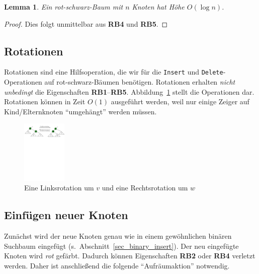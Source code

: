 \documentclass[10pt,reqno]{amsart}
\numberwithin{equation}{section}
\newtheorem{lemma}[definition]{Lemma}
\begin{document}
\begin{lemma}\label{lem_rb}
	Ein rot-schwarz-Baum mit $n$ Knoten hat H\"ohe $O(\log n)$.
\end{lemma}
\begin{proof}
	Dies folgt unmittelbar aus {\bf RB4} und {\bf RB5}.
\end{proof}

\subsection{Rotationen}\label{sec_rb_rot}
Rotationen sind eine Hilfsoperation, die wir f\"ur die {\tt Insert} und {\tt Delete}-Operationen auf rot-schwarz-B\"aumen ben\"otigen.
Rotationen erhalten {\em nicht unbedingt} die Eigenschaften {\bf RB1}--{\bf RB5}.
Abbildung~\ref{fig_rotate} stellt die Operationen dar.
Rotationen k\"onnen in Zeit $O(1)$ ausgef\"uhrt werden, weil nur einige Zeiger auf Kind/Elternknoten ``umgeh\"angt'' werden m\"ussen.

\begin{figure}
	\includegraphics[height=30mm]{./images/rotate1.pdf}
	\caption{Eine Linksrotation um $v$ und eine Rechtsrotation um $w$}\label{fig_rotate}
\end{figure}

\subsection{Einf\"ugen neuer Knoten}\label{sec_rb_insert}

Zun\"achst wird der neue Knoten genau wie in einem gew\"ohnlichen bin\"aren Suchbaum eingef\"ugt (s.\ Abschnitt~\ref{sec_binary_insert}).
Der neu eingef\"ugte Knoten wird {\em rot} gef\"arbt.
Dadurch k\"onnen Eigenschaften {\bf RB2} oder {\bf RB4} verletzt werden.
Daher ist anschlie\ss end die folgende ``Aufr\"aumaktion'' notwendig.
\end{document}
